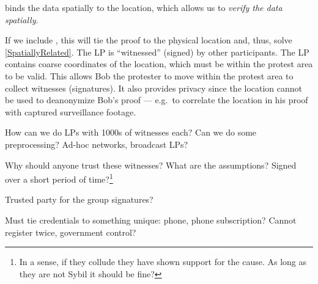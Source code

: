  binds the data spatially to the location, which allows 
us to \emph{verify the data spatially}.

If we include , this will tie the proof to the physical location and, 
thus, solve \cref{SpatiallyRelated}.
The \ac{LP} is \enquote{witnessed} (signed) by other participants.
The \ac{LP} contains coarse coordinates of the location, which must be within 
the protest area to be valid.
This allows Bob the protester to move within the protest area to collect 
witnesses (signatures).
It also provides privacy since the location cannot be used to deanonymize Bob's 
proof --- e.g.\ to correlate the location in his proof with captured 
surveillance footage.


\begin{question}
  How can we do \acp{LP} with 1000s of witnesses each?
  Can we do some preprocessing?
  Ad-hoc networks, broadcast \acp{LP}?
\end{question}
\begin{question}
  Why should anyone trust these witnesses?
  What are the assumptions?
  Signed over a short period of time?\footnote{%
    In a sense, if they collude they have shown support for the cause.
    As long as they are not Sybil it should be fine?
  }
\end{question}
\begin{question}
  Trusted party for the group signatures?
\end{question}
\begin{question}
  Must tie credentials to something unique: phone, phone subscription?
  Cannot register twice, government control?
\end{question}

